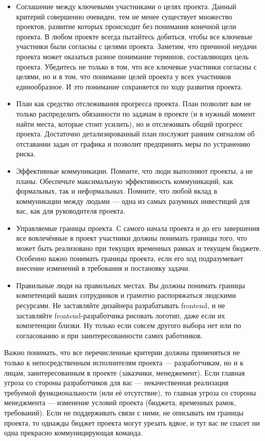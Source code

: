 \documentclass{../../text-style}
\begin{document}
\begin{itemize}
    \item Соглашение между ключевыми участниками о целях проекта. Данный критерий совершенно очевиден, тем не менее существует множество проектов, развитие которых происходит без понимания конечной цели проекта. В любом проекте всегда пытайтесь добиться, чтобы все ключевые участники были согласны с целями проекта. Заметим, что причиной неудачи проекта может оказаться разное понимание терминов, составляющих цель проекта. Убедитесь не только в том, что все ключевые участники согласны с целями, но и в том, что понимание целей проекта у всех участников единообразное. И это понимание сохраняется по ходу развития проекта.
    \item План как средство отслеживания прогресса проекта. План позволит вам не только распределить обязанности по задачам в проекте (и в нужный момент найти места, которые стоит усилить), но и отслеживать общий прогресс проекта. Достаточно детализированный план послужит ранним сигналом об отставании задач от графика и позволит предпринять меры по устранению риска.
    \item Эффективные коммуникации. Помните, что люди выполняют проекты, а не планы. Обеспечьте максимальную эффективность коммуникаций, как формальных, так и неформальных. Помните, что любой вклад в коммуникации между людьми --- одна из самых разумных инвестиций для вас, как для руководителя проекта.
    \item Управляемые границы проекта. С самого начала проекта и до его завершения все вовлечённые в проект участники должны понимать границы того, что может быть реализовано при текущих временных рамках и текущем бюджете. Особенно важно понимать границы проекта, если его ход подразумевает внесение изменений в требования и постановку задачи.
    \item Правильные люди на правильных местах. Вы должны понимать границы компетенций ваших сотрудников и грамотно распоряжаться людскими ресурсами. Не заставляйте дизайнера разрабатывать frontend, и не заставляйте frontend-разработчика рисовать логотип, даже если их компетенции близки. Ну только если совсем другого выбора нет или по согласованию и при заинтересованности самих работников.
\end{itemize}

Важно понимать, что все перечисленные критерии должны применяться не только к непосредственным исполнителям проекта --- разработчикам, но и к лицам, заинтересованным в проекте (заказчики, менеджемент). Если главная угроза со стороны разработчиков для вас --- некачественная реализация требуемой функциональности (или её отсутствие), то главная угроза со стороны менеджмента --- изменение условий проекта (бюджета, временных рамок, требований). Если не поддерживать связи с ними, не описывать им границы проекта, то однажды бюджет проекта могут урезать вдвое, и тут вас не спасет ни одна прекрасно коммуницирующая команда.
\end{document}

